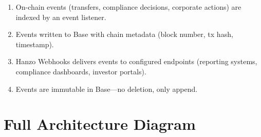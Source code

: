 \documentclass[11pt]{article}
\begin{document}
\begin{enumerate}[leftmargin=1.4em]
    \item On-chain events (transfers, compliance decisions, corporate
    actions) are indexed by an event listener.
    \item Events written to Base with chain metadata (block number,
    tx hash, timestamp).
    \item Hanzo Webhooks delivers events to configured endpoints
    (reporting systems, compliance dashboards, investor portals).
    \item Events are immutable in Base---no deletion, only append.
\end{enumerate}

\section{Full Architecture Diagram}
\label{sec:fullarch}
\end{document}
